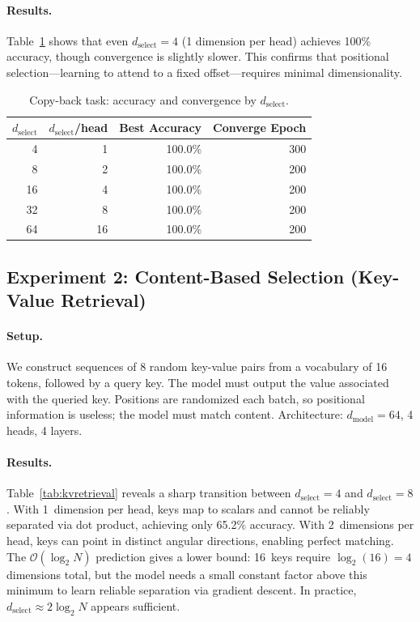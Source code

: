\documentclass{article} %
\newcommand{\dmodel}{d_{\text{model}}}
\newcommand{\dselect}{d_{\text{select}}}
\newcommand{\BigO}{\mathcal{O}}
\begin{document}
\paragraph{Results.}
Table~\ref{tab:copyback} shows that even $\dselect = 4$ (1 dimension per head) achieves 100\% accuracy, though convergence is slightly slower. This confirms that positional selection---learning to attend to a fixed offset---requires minimal dimensionality.

\begin{table}[h]
\centering
\caption{Copy-back task: accuracy and convergence by $\dselect$.}
\label{tab:copyback}
\begin{tabular}{rrrr}
\toprule
$\dselect$ & $\dselect$/head & Best Accuracy & Converge Epoch \\
\midrule
4  & 1  & 100.0\% & 300 \\
8  & 2  & 100.0\% & 200 \\
16 & 4  & 100.0\% & 200 \\
32 & 8  & 100.0\% & 200 \\
64 & 16 & 100.0\% & 200 \\
\bottomrule
\end{tabular}
\end{table}


\subsection{Experiment 2: Content-Based Selection (Key-Value Retrieval)}

\paragraph{Setup.}
We construct sequences of 8 random key-value pairs from a vocabulary of 16 tokens, followed by a query key. The model must output the value associated with the queried key. Positions are randomized each batch, so positional information is useless; the model must match content. Architecture: $\dmodel = 64$, 4 heads, 4 layers.

\paragraph{Results.}
Table~\ref{tab:kvretrieval} reveals a sharp transition between $\dselect = 4$ and $\dselect = 8$. With 1~dimension per head, keys map to scalars and cannot be reliably separated via dot product, achieving only 65.2\% accuracy. With 2~dimensions per head, keys can point in distinct angular directions, enabling perfect matching. The $\BigO(\log_2 N)$ prediction gives a lower bound: 16~keys require $\log_2(16) = 4$ dimensions total, but the model needs a small constant factor above this minimum to learn reliable separation via gradient descent. In practice, $\dselect \approx 2\log_2 N$ appears sufficient.
\end{document}
